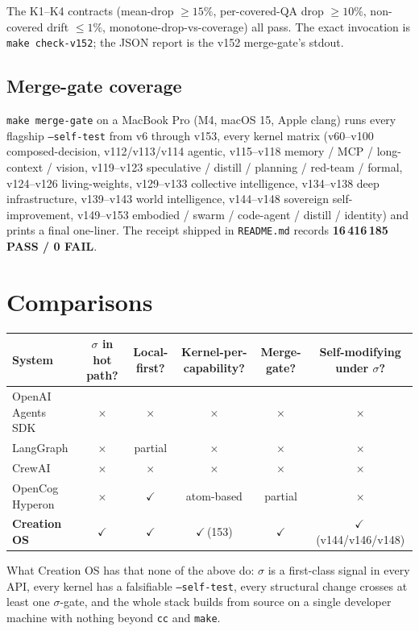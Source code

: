 \documentclass[11pt,letterpaper]{article}
\newcommand{\code}[1]{\texttt{#1}}
\begin{document}
The K1--K4 contracts (mean-drop $\ge 15\%$, per-covered-QA drop
$\ge 10\%$, non-covered drift $\le 1\%$, monotone-drop-vs-coverage)
all pass. The exact invocation is \code{make check-v152}; the
JSON report is the v152 merge-gate's stdout.

\subsection{Merge-gate coverage}

\code{make merge-gate} on a MacBook Pro (M4, macOS 15, Apple
clang) runs every flagship \code{--self-test} from v6 through
v153, every kernel matrix (v60--v100 composed-decision,
v112/v113/v114 agentic, v115--v118 memory / MCP / long-context /
vision, v119--v123 speculative / distill / planning / red-team /
formal, v124--v126 living-weights, v129--v133 collective
intelligence, v134--v138 deep infrastructure, v139--v143 world
intelligence, v144--v148 sovereign self-improvement, v149--v153
embodied / swarm / code-agent / distill / identity) and prints a
final one-liner. The receipt shipped in \code{README.md} records
\textbf{16\,416\,185 PASS / 0 FAIL}.

\section{Comparisons}

\begin{center}
\begin{tabular}{@{}lccccc@{}}
\toprule
System & $\sigma$ in hot path? & Local-first? & Kernel-per-capability? & Merge-gate? & Self-modifying under $\sigma$? \\
\midrule
OpenAI Agents SDK & $\times$ & $\times$ & $\times$ & $\times$ & $\times$ \\
LangGraph & $\times$ & partial & $\times$ & $\times$ & $\times$ \\
CrewAI & $\times$ & $\times$ & $\times$ & $\times$ & $\times$ \\
OpenCog Hyperon & $\times$ & $\checkmark$ & atom-based & partial & $\times$ \\
\textbf{Creation OS} & $\checkmark$ & $\checkmark$ & $\checkmark$\,(153) & $\checkmark$ & $\checkmark$\,(v144/v146/v148) \\
\bottomrule
\end{tabular}
\end{center}

What Creation OS has that none of the above do: $\sigma$ is a
first-class signal in every API, every kernel has a falsifiable
\code{--self-test}, every structural change crosses at least one
$\sigma$-gate, and the whole stack builds from source on a single
developer machine with nothing beyond \code{cc} and \code{make}.
\end{document}
